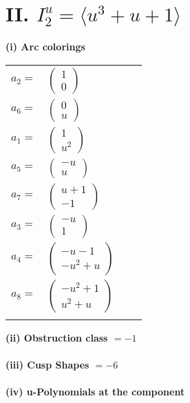 \documentclass[1p]{elsarticle_modified}
\theoremstyle{definition}
\begin{document}
\centering \section*{II. $I^u_{2}= \langle u^3+u+1 \rangle$}
\flushleft \textbf{(i) Arc colorings}\\
\begin{tabular}{m{7pt} m{180pt} m{7pt} m{180pt} }
\flushright $a_{2}=$&$\begin{pmatrix}1\\0\end{pmatrix}$ \\
\flushright $a_{6}=$&$\begin{pmatrix}0\\u\end{pmatrix}$ \\
\flushright $a_{1}=$&$\begin{pmatrix}1\\u^2\end{pmatrix}$ \\
\flushright $a_{5}=$&$\begin{pmatrix}- u\\u\end{pmatrix}$ \\
\flushright $a_{7}=$&$\begin{pmatrix}u+1\\-1\end{pmatrix}$ \\
\flushright $a_{3}=$&$\begin{pmatrix}- u\\1\end{pmatrix}$ \\
\flushright $a_{4}=$&$\begin{pmatrix}- u-1\\- u^2+u\end{pmatrix}$ \\
\flushright $a_{8}=$&$\begin{pmatrix}- u^2+1\\u^2+u\end{pmatrix}$\\&\end{tabular}
\flushleft \textbf{(ii) Obstruction class $= -1$}\\~\\
\flushleft \textbf{(iii) Cusp Shapes $= -6$}\\~\\
\newpage\renewcommand{\arraystretch}{1}
\flushleft \textbf{(iv) u-Polynomials at the component}\newline \\
\end{document}
